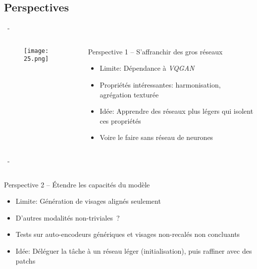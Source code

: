 \documentclass[aspectratio=169, 22pt]{beamer}
\begin{document}
\subsection{Perspectives}
\begin{frame}{\secname~- \subsecname}
  \begin{columns}
    \begin{column}{0.3\linewidth}
      \begin{figure}
        \centering
        \texttt{[image: 25.png]}
      \end{figure}
    \end{column}
    \begin{column}{0.7\linewidth}
      \begin{block}{Perspective 1 – S'affranchir des gros réseaux}
        \begin{itemize}
        \item \alert{Limite}: Dépendance à \emph{VQGAN}
        \item Propriétés intéressantes: harmonisation, agrégation texturée

        \item \alert{Idée}: Apprendre des réseaux plus légers qui isolent ces propriétés
        \item Voire le faire sans réseau de neurones
        \end{itemize}

      \end{block}
    \end{column}
  \end{columns}
\end{frame}

\begin{frame}{\secname~- \subsecname}
  \begin{columns}
    \begin{column}{\linewidth}
      \begin{block}{Perspective 2 – Étendre les capacités du modèle}
        \begin{itemize}
        \item \alert{Limite}: Génération de visages alignés seulement
        \item D'autres modalités non-triviales ?

        \item Tests sur auto-encodeurs génériques et visages non-recalés non concluants
        \item \alert{Idée}: Déléguer la tâche à un réseau léger
          (initialisation), puis raffiner avec des patchs
        \end{itemize}

      \end{block}
    \end{column}
  \end{columns}
\end{frame}
\end{document}
